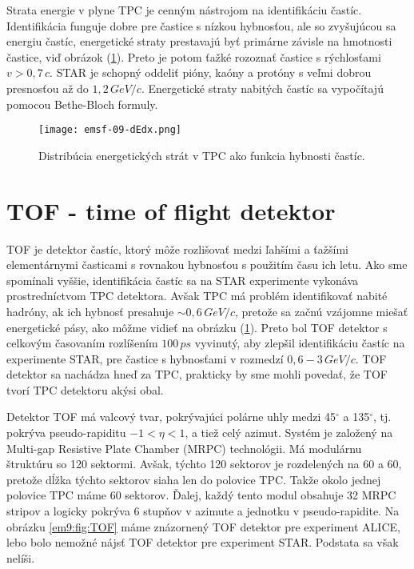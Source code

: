 \documentclass[../../main.tex]{subfiles}
\begin{document}
Strata energie v plyne TPC je cenným nástrojom na identifikáciu častíc. Identifikácia funguje dobre pre častice s nízkou hybnosťou, ale so zvyšujúcou sa energiu častíc, energetické straty prestavajú byť primárne závisle na hmotnosti častice, viď obrázok (\ref{em9:fig:dEdx}). Preto je potom ťažké rozoznať častice s rýchlosťami $v> 0,7\,c$. STAR je schopný oddeliť pióny, kaóny a protóny s veľmi dobrou presnosťou až do $1,2\,\unit{GeV}/c$. Energetické straty nabitých častíc sa vypočítajú pomocou Bethe-Bloch formuly.

\begin{figure}[!h]
\texttt{[image: emsf-09-dEdx.png]}
\centering
\caption{Distribúcia energetických strát v TPC ako funkcia hybnosti častíc.}
\label{em9:fig:dEdx}
\end{figure}

\section{TOF - time of flight detektor}
TOF je detektor častíc, ktorý môže rozlišovať medzi ľahšími a ťažšími elementárnymi časticami s rovnakou hybnosťou s použitím času ich letu.
Ako sme spomínali vyššie, identifikácia častíc sa na STAR experimente vykonáva prostredníctvom TPC detektora. Avšak TPC má problém identifikovať nabité hadróny, ak ich hybnosť presahuje $\sim 0,6\,\unit{GeV}/c$, pretože sa začnú vzájomne miešať energetické pásy, ako môžme vidieť na obrázku (\ref{em9:fig:dEdx}). Preto bol TOF detektor s celkovým časovaním rozlíšením $100\,\unit{ps}$ vyvinutý, aby zlepšil identifikáciu častíc na experimente STAR, pre častice s hybnosťami v rozmedzí $0,6-3\,\unit{GeV}/c$. TOF detektor sa nachádza hneď za TPC, prakticky by sme mohli povedať, že TOF tvorí TPC detektoru akýsi obal.

Detektor TOF má valcový tvar, pokrývajúci polárne uhly medzi 45$^\circ$ a 135$^\circ$, tj. pokrýva pseudo-rapiditu $-1 < \eta < 1$, a tiež celý azimut. Systém je založený na Multi-gap Resistive Plate Chamber (MRPC) technológii. Má modulárnu štruktúru so 120 sektormi. Avšak, týchto 120 sektorov je rozdelených na 60 a 60, pretože dĺžka týchto sektorov siaha len do polovice TPC. Takže okolo jednej polovice TPC máme 60 sektorov. Ďalej, každý tento modul obsahuje 32 MRPC stripov a logicky pokrýva 6 stupňov v azimute a jednotku v pseudo-rapidite. Na obrázku \ref{em9:fig:TOF} máme znázornený TOF detektor pre experiment ALICE, lebo bolo nemožné nájsť TOF detektor pre experiment STAR. Podstata sa však nelíši.
\end{document}
